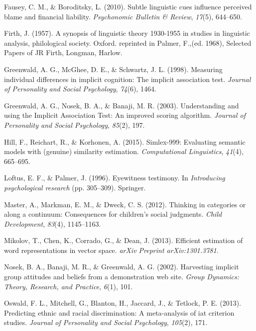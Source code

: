\documentclass[10pt, letterpaper]{article}
\begin{document}
\hypertarget{ref-fausey2010subtle}{}
Fausey, C. M., \& Boroditsky, L. (2010). Subtle linguistic cues
influence perceived blame and financial liability. \emph{Psychonomic
Bulletin \& Review}, \emph{17}(5), 644--650.

\hypertarget{ref-firth1957synopsis}{}
Firth, J. (1957). A synopsis of linguistic theory 1930-1955 in studies
in linguistic analysis, philological society. Oxford. reprinted in
Palmer, F.,(ed. 1968), Selected Papers of JR Firth, Longman, Harlow.

\hypertarget{ref-greenwald1998measuring}{}
Greenwald, A. G., McGhee, D. E., \& Schwartz, J. L. (1998). Measuring
individual differences in implicit cognition: The implicit association
test. \emph{Journal of Personality and Social Psychology}, \emph{74}(6),
1464.

\hypertarget{ref-greenwald2003understanding}{}
Greenwald, A. G., Nosek, B. A., \& Banaji, M. R. (2003). Understanding
and using the Implicit Association Test: An improved scoring algorithm.
\emph{Journal of Personality and Social Psychology}, \emph{85}(2), 197.

\hypertarget{ref-hill2015simlex}{}
Hill, F., Reichart, R., \& Korhonen, A. (2015). Simlex-999: Evaluating
semantic models with (genuine) similarity estimation.
\emph{Computational Linguistics}, \emph{41}(4), 665--695.

\hypertarget{ref-loftus1996eyewitness}{}
Loftus, E. F., \& Palmer, J. (1996). Eyewitness testimony. In
\emph{Introducing psychological research} (pp. 305--309). Springer.

\hypertarget{ref-master2012thinking}{}
Master, A., Markman, E. M., \& Dweck, C. S. (2012). Thinking in
categories or along a continuum: Consequences for children's social
judgments. \emph{Child Development}, \emph{83}(4), 1145--1163.

\hypertarget{ref-mikolov2013efficient}{}
Mikolov, T., Chen, K., Corrado, G., \& Dean, J. (2013). Efficient
estimation of word representations in vector space. \emph{arXiv Preprint
arXiv:1301.3781}.

\hypertarget{ref-nosek2002harvesting}{}
Nosek, B. A., Banaji, M. R., \& Greenwald, A. G. (2002). Harvesting
implicit group attitudes and beliefs from a demonstration web site.
\emph{Group Dynamics: Theory, Research, and Practice}, \emph{6}(1), 101.

\hypertarget{ref-oswald2013predicting}{}
Oswald, F. L., Mitchell, G., Blanton, H., Jaccard, J., \& Tetlock, P. E.
(2013). Predicting ethnic and racial discrimination: A meta-analysis of
iat criterion studies. \emph{Journal of Personality and Social
Psychology}, \emph{105}(2), 171.
\end{document}
